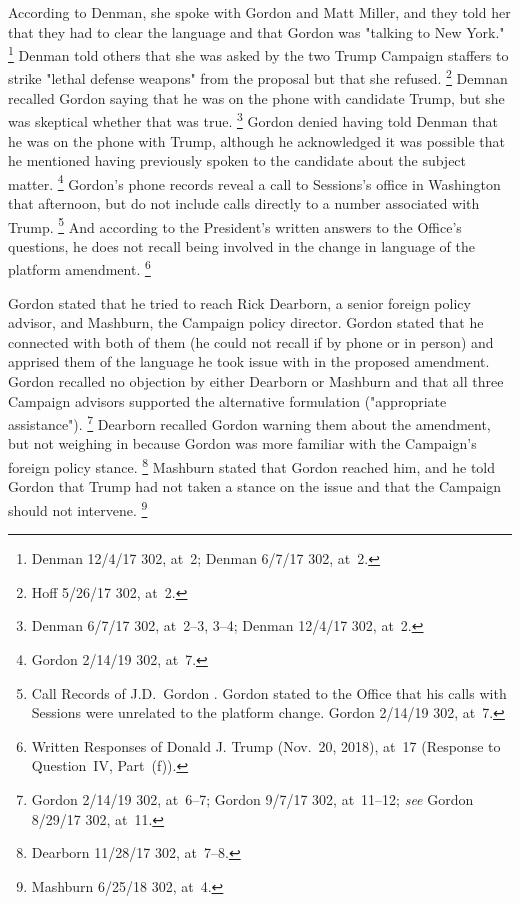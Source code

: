 According to Denman, she spoke with Gordon and Matt Miller, and they told her that they had to clear the language and that Gordon was "talking to New York."%
\footnote{Denman 12/4/17 302, at~2;
Denman 6/7/17 302, at~2.}
Denman told others that she was asked by the two Trump Campaign staffers to strike "lethal defense weapons" from the proposal but that she refused.%
\footnote{Hoff 5/26/17 302, at~2.}
Demnan recalled Gordon saying that he was on the phone with candidate Trump, but she was skeptical whether that was true.%
\footnote{Denman 6/7/17 302, at~2--3, 3--4;
Denman 12/4/17 302, at~2.}
Gordon denied having told Denman that he was on the phone with Trump, although he acknowledged it was possible that he mentioned having previously spoken to the candidate about the subject matter.%
\footnote{Gordon 2/14/19 302, at~7.}
Gordon's phone records reveal a call to Sessions's office in Washington that afternoon, but do not include calls directly to a number associated with Trump.%
\footnote{Call Records of J.D.~Gordon .
Gordon stated to the Office that his calls with Sessions were unrelated to the platform change. Gordon 2/14/19 302, at~7.}
And according to the President's written answers to the Office's questions, he does not recall being involved in the change in language of the platform amendment.%
\footnote{Written Responses of Donald J. Trump (Nov.~20, 2018), at~17 (Response to Question~IV, Part~(f)).}

Gordon stated that he tried to reach Rick Dearborn, a senior foreign policy advisor, and Mashburn, the Campaign policy director.
Gordon stated that he connected with both of them (he could not recall if by phone or in person) and apprised them of the language he took issue with in the proposed amendment.
Gordon recalled no objection by either Dearborn or Mashburn and that all three Campaign advisors supported the alternative formulation ("appropriate assistance").%
\footnote{Gordon 2/14/19 302, at~6--7;
Gordon 9/7/17 302, at~11--12;
\textit{see} Gordon 8/29/17 302, at~11.}
Dearborn recalled Gordon warning them about the amendment, but not weighing in because Gordon was more familiar with the Campaign's foreign policy stance.%
\footnote{Dearborn 11/28/17 302, at~7--8.}
Mashburn stated that Gordon reached him, and he told Gordon that Trump had not taken a stance on the issue and that the Campaign should not intervene.%
\footnote{Mashburn 6/25/18 302, at~4.}

